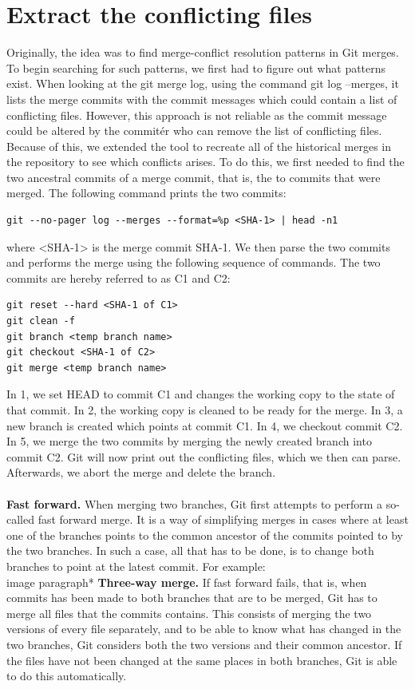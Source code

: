 \section{Extract the conflicting files}
Originally, the idea was to find merge-conflict resolution patterns in Git merges. To begin searching for such patterns, we first had to figure out what patterns exist. When looking at the git merge log, using the command git log --merges, it lists the merge commits with the commit messages which could contain a list of conflicting files. However, this approach is not reliable as the commit message could be altered by the commitér who can remove the list of conflicting files. Because of this, we extended the tool to recreate all of the historical merges in the repository to see which conflicts arises. To do this, we first needed to find the two ancestral commits of a merge commit, that is, the to commits that were merged. The following command prints the two commits:
\lstset{language=Bash}
\begin{lstlisting}[frame=single]
git --no-pager log --merges --format=%p <SHA-1> | head -n1
\end{lstlisting}
where <SHA-1> is the merge commit SHA-1. We then parse the two commits and performs the merge using the following sequence of commands. The two commits are hereby referred to as C1 and C2:\\
\lstset{language=Bash}
\begin{lstlisting}[frame=single]
git reset --hard <SHA-1 of C1>
git clean -f
git branch <temp branch name>
git checkout <SHA-1 of C2>
git merge <temp branch name>
\end{lstlisting}
In 1, we set HEAD to commit C1 and changes the working copy to the state of that commit. In 2,  the working copy is cleaned to be ready for the merge. In 3, a new branch is created which points at commit C1. In 4, we checkout commit C2. In 5, we merge the two commits by merging the newly created branch into commit C2. Git will now print out the conflicting files, which we then can parse. Afterwards, we abort the merge and delete the branch.
\paragraph*{}
\textbf{Fast forward.} When merging two branches, Git first attempts to perform a so-called fast forward merge. It is a way of simplifying merges in cases where at least one of the branches points to the common ancestor of the commits pointed to by the two branches. In such a case, all that has to be done, is to change both branches to point at the latest commit. For example:\\
image
paragraph*{}
\textbf{Three-way merge.} If fast forward fails, that is, when commits has been made to both branches that are to be merged, Git has to merge all files that the commits contains. This consists of merging the two versions of every file separately, and to be able to know what has changed in the two branches, Git considers both the two versions and their common ancestor. If the files have not been changed at the same places in both branches, Git is able to do this automatically.
